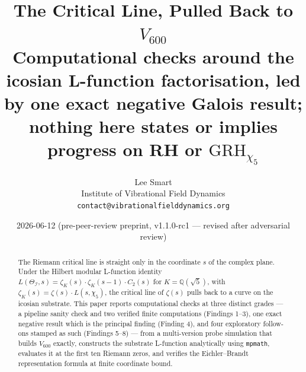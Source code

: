 \documentclass[11pt,a4paper]{article}
\title{\textbf{The Critical Line, Pulled Back to $V_{600}$}\\[0.4em]
\large Computational checks around the icosian L-function
factorisation, led by one exact negative Galois result; nothing here
states or implies progress on RH or $\mathrm{GRH}_{\chi_5}$}
\author{Lee Smart\\
\small Institute of Vibrational Field Dynamics\\
\small \texttt{contact@vibrationalfielddynamics.org}}
\date{2026-06-12 \quad (pre-peer-review preprint, v1.1.0-rc1 --- revised after adversarial review)}
\newcommand{\II}{\mathcal{I}}
\newcommand{\Vsix}{V_{600}}
\newcommand{\Q}{\mathbb{Q}}
\begin{document}
\maketitle

\begin{abstract}
\noindent
The Riemann critical line is straight only in the coordinate $s$ of
the complex plane. Under the Hilbert modular L-function identity
$L(\Theta_\II, s) = \zeta_K(s) \cdot \zeta_K(s-1) \cdot C_2(s)$ for
$K = \Q(\sqrt 5)$, with $\zeta_K(s) = \zeta(s) \cdot L(s, \chi_5)$,
the critical line of $\zeta(s)$ pulls back to a curve on the
icosian substrate. This paper reports computational checks at three
distinct grades --- a pipeline sanity check and two verified finite
computations (Findings 1--3), one exact negative result which is
the principal finding (Finding 4), and four exploratory follow-ons
stamped as such (Findings 5--8) --- from a multi-version probe
simulation that builds $\Vsix$ exactly,
constructs the substrate L-function analytically using
\texttt{mpmath}, evaluates it at the first ten Riemann zeros, and
verifies the Eichler--Brandt representation formula at finite
coordinate bound.


\end{abstract}
\end{document}
